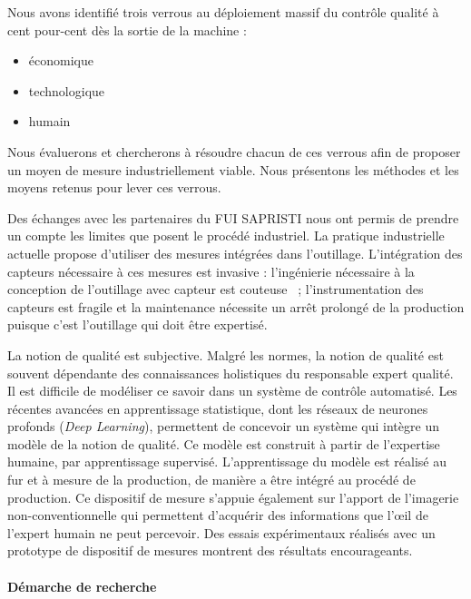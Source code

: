 Nous avons identifié trois verrous au déploiement massif du contrôle qualité à cent pour-cent dès la sortie de la machine :
\begin{itemize}
	\item économique
	\item technologique
	\item humain
\end{itemize}
Nous évaluerons et chercherons à résoudre chacun de ces verrous afin de proposer un moyen de mesure industriellement viable.
Nous présentons les méthodes et les moyens retenus pour lever ces verrous.

Des échanges avec les partenaires du FUI SAPRISTI nous ont permis de prendre un compte les limites que posent le procédé industriel.
La pratique industrielle actuelle propose d'utiliser des mesures intégrées dans l'outillage.
L'intégration des capteurs nécessaire à ces mesures est invasive : l'ingénierie nécessaire à la conception de l'outillage avec capteur est couteuse \ ; l'instrumentation des capteurs est fragile et la maintenance nécessite un arrêt prolongé de la production puisque c'est l'outillage qui doit être expertisé.

La notion de qualité est subjective.
Malgré les normes, la notion de qualité est souvent dépendante des connaissances holistiques du responsable expert qualité.
Il est difficile de modéliser ce savoir dans un système de contrôle automatisé.
Les récentes avancées en apprentissage statistique, dont les réseaux de neurones profonds (\textit{Deep Learning}), permettent de concevoir un système qui intègre un modèle de la notion de qualité.
Ce modèle est construit à partir de l’expertise humaine, par apprentissage supervisé.
L’apprentissage du modèle est réalisé au fur et à mesure de la production, de manière a être intégré au procédé de production.
Ce dispositif de mesure s'appuie également sur l'apport de l'imagerie non-conventionnelle qui permettent d'acquérir des informations que l'œil de l'expert humain ne peut percevoir.
Des essais expérimentaux réalisés avec un prototype de dispositif de mesures montrent des résultats encourageants.

\bigskip
\paragraph{Démarche de recherche}\mbox{} \\


